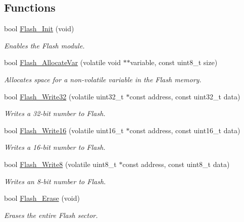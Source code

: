 \subsection*{Functions}
\begin{DoxyCompactItemize}
\item 
bool \hyperlink{group__flash__module_gaa5782279b5e558cafc2f135c0a1177d3}{Flash\+\_\+\+Init} (void)
\begin{DoxyCompactList}\small\item\em Enables the Flash module. \end{DoxyCompactList}\item 
bool \hyperlink{group__flash__module_ga50871aff0f5af1e092aea3ed2545cf72}{Flash\+\_\+\+Allocate\+Var} (volatile void $\ast$$\ast$variable, const uint8\+\_\+t size)
\begin{DoxyCompactList}\small\item\em Allocates space for a non-\/volatile variable in the Flash memory. \end{DoxyCompactList}\item 
bool \hyperlink{group__flash__module_ga5da7dcc0c6ef765546c79bbe25b48479}{Flash\+\_\+\+Write32} (volatile uint32\+\_\+t $\ast$const address, const uint32\+\_\+t data)
\begin{DoxyCompactList}\small\item\em Writes a 32-\/bit number to Flash. \end{DoxyCompactList}\item 
bool \hyperlink{group__flash__module_ga1458f5e4ac15e1848ae0bde32fe5b5f3}{Flash\+\_\+\+Write16} (volatile uint16\+\_\+t $\ast$const address, const uint16\+\_\+t data)
\begin{DoxyCompactList}\small\item\em Writes a 16-\/bit number to Flash. \end{DoxyCompactList}\item 
bool \hyperlink{group__flash__module_ga1e6f34b272d8ed7b0f897b43e65f2cc0}{Flash\+\_\+\+Write8} (volatile uint8\+\_\+t $\ast$const address, const uint8\+\_\+t data)
\begin{DoxyCompactList}\small\item\em Writes an 8-\/bit number to Flash. \end{DoxyCompactList}\item 
bool \hyperlink{group__flash__module_ga06868787ccef73e69bd236d3b93b68f3}{Flash\+\_\+\+Erase} (void)
\begin{DoxyCompactList}\small\item\em Erases the entire Flash sector. \end{DoxyCompactList}\end{DoxyCompactItemize}
